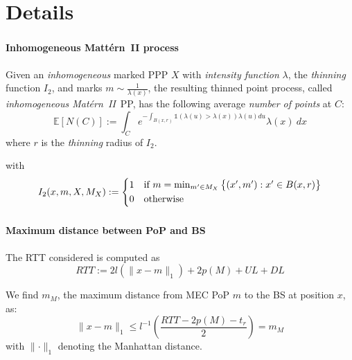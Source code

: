 \documentclass[aspectratio=169]{beamer}
\begin{document}
\section*{Details}
\begin{frame}
    \frametitle{\secname}
    \framesubtitle{Inhomogeneous Mattérn~II process}
    \begin{lemma}
    Given an \emph{inhomogeneous} marked PPP $X$ with \emph{intensity function} $\lambda$, the \emph{thinning} function $I_2$, and marks $m \sim \frac{1}{\lambda(x)}$, the resulting thinned point process, called \emph{inhomogeneous Mat\'ern~II}~PP, has the following average \emph{number of points} at $C$:
        \begin{equation}
            \mathbb{E}\left[ N(C) \right] := \int_C e^{-\int_{B(x,r)} \mathds{1}\left(\lambda(u) > \lambda(x) \right) \lambda(u) du} \lambda(x)\ dx
            \label{eq:inh-matern2-avg}
        \end{equation}
        where $r$ is the \emph{thinning} radius of $I_2$.
        \label{prop:inh-matern2-avg}
    \end{lemma}



    \vfill
    with
    \begin{equation}
        I_2(x,m, X, M_X) := \begin{cases*}
            1 & if $m = \min_{m' \in M_X}\big\{ (x',m'): x'\in B(x,r) \big\}$\\
            0 & otherwise
        \end{cases*}
        \label{eq:matern2}
    \end{equation}

\end{frame}





\begin{frame}
    \frametitle{\secname}
    \framesubtitle{Maximum distance between PoP and BS}


    The RTT considered is computed as
    \begin{equation}
        RTT := 2 l\left(\lVert x - m \rVert_1 \right) + 2 p(M) + UL + DL
        \label{eq:rtt}
    \end{equation}


    We find $m_M$, the maximum distance from MEC PoP $m$ to the BS at position $x$, as:
    \begin{equation}
        \lVert x-m \rVert_1 \le l^{-1}\left( \frac{RTT - 2p(M) - t_r}{2} \right)  = m_M
        \label{eq:max-dis}
    \end{equation}
    with $\lVert \cdot \rVert_1$ denoting the Manhattan distance.
\end{frame}
\end{document}
